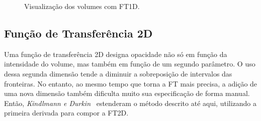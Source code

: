 \begin{figure}[]
	\centering
	\caption{Visualização dos volumes com FT1D.}
	\label{fig:g_res_vis_1d}
\end{figure}

\clearpage
\subsection{Função de Transferência 2D}
\label{subsec:gordon.2d}
	Uma função de transferência 2D designa opacidade não só em função da intensidade do volume, mas também em função de um segundo parâmetro. O uso dessa segunda dimensão tende a diminuir a sobreposição de intervalos das fronteiras. No entanto, ao mesmo tempo que torna a FT mais precisa, a adição de uma nova dimensão também dificulta muito sua especificação de forma manual. Então, 
	\textit{Kindlmann e Durkin}~\cite{gordon} estenderam o método descrito até aqui, utilizando a primeira derivada para compor a FT2D.
	

